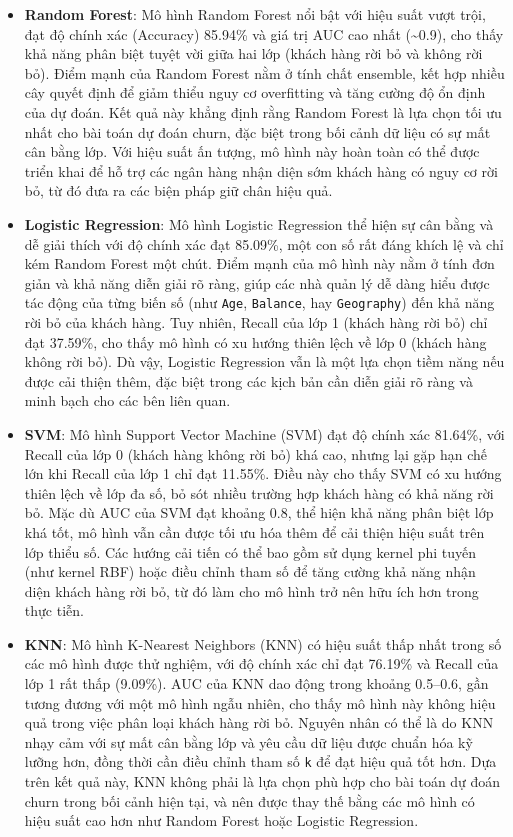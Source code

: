 \documentclass[
]{article}
\begin{document}
\begin{itemize}
\item
  \textbf{Random Forest}: Mô hình Random Forest nổi bật với hiệu suất
  vượt trội, đạt độ chính xác (Accuracy) 85.94\% và giá trị AUC cao nhất
  (\textasciitilde0.9), cho thấy khả năng phân biệt tuyệt vời giữa hai
  lớp (khách hàng rời bỏ và không rời bỏ). Điểm mạnh của Random Forest
  nằm ở tính chất ensemble, kết hợp nhiều cây quyết định để giảm thiểu
  nguy cơ overfitting và tăng cường độ ổn định của dự đoán. Kết quả này
  khẳng định rằng Random Forest là lựa chọn tối ưu nhất cho bài toán dự
  đoán churn, đặc biệt trong bối cảnh dữ liệu có sự mất cân bằng lớp.
  Với hiệu suất ấn tượng, mô hình này hoàn toàn có thể được triển khai
  để hỗ trợ các ngân hàng nhận diện sớm khách hàng có nguy cơ rời bỏ, từ
  đó đưa ra các biện pháp giữ chân hiệu quả.
\item
  \textbf{Logistic Regression}: Mô hình Logistic Regression thể hiện sự
  cân bằng và dễ giải thích với độ chính xác đạt 85.09\%, một con số rất
  đáng khích lệ và chỉ kém Random Forest một chút. Điểm mạnh của mô hình
  này nằm ở tính đơn giản và khả năng diễn giải rõ ràng, giúp các nhà
  quản lý dễ dàng hiểu được tác động của từng biến số (như \texttt{Age},
  \texttt{Balance}, hay \texttt{Geography}) đến khả năng rời bỏ của
  khách hàng. Tuy nhiên, Recall của lớp 1 (khách hàng rời bỏ) chỉ đạt
  37.59\%, cho thấy mô hình có xu hướng thiên lệch về lớp 0 (khách hàng
  không rời bỏ). Dù vậy, Logistic Regression vẫn là một lựa chọn tiềm
  năng nếu được cải thiện thêm, đặc biệt trong các kịch bản cần diễn
  giải rõ ràng và minh bạch cho các bên liên quan.
\item
  \textbf{SVM}: Mô hình Support Vector Machine (SVM) đạt độ chính xác
  81.64\%, với Recall của lớp 0 (khách hàng không rời bỏ) khá cao, nhưng
  lại gặp hạn chế lớn khi Recall của lớp 1 chỉ đạt 11.55\%. Điều này cho
  thấy SVM có xu hướng thiên lệch về lớp đa số, bỏ sót nhiều trường hợp
  khách hàng có khả năng rời bỏ. Mặc dù AUC của SVM đạt khoảng 0.8, thể
  hiện khả năng phân biệt lớp khá tốt, mô hình vẫn cần được tối ưu hóa
  thêm để cải thiện hiệu suất trên lớp thiểu số. Các hướng cải tiến có
  thể bao gồm sử dụng kernel phi tuyến (như kernel RBF) hoặc điều chỉnh
  tham số để tăng cường khả năng nhận diện khách hàng rời bỏ, từ đó làm
  cho mô hình trở nên hữu ích hơn trong thực tiễn.
\item
  \textbf{KNN}: Mô hình K-Nearest Neighbors (KNN) có hiệu suất thấp nhất
  trong số các mô hình được thử nghiệm, với độ chính xác chỉ đạt 76.19\%
  và Recall của lớp 1 rất thấp (9.09\%). AUC của KNN dao động trong
  khoảng 0.5--0.6, gần tương đương với một mô hình ngẫu nhiên, cho thấy
  mô hình này không hiệu quả trong việc phân loại khách hàng rời bỏ.
  Nguyên nhân có thể là do KNN nhạy cảm với sự mất cân bằng lớp và yêu
  cầu dữ liệu được chuẩn hóa kỹ lưỡng hơn, đồng thời cần điều chỉnh tham
  số \texttt{k} để đạt hiệu quả tốt hơn. Dựa trên kết quả này, KNN không
  phải là lựa chọn phù hợp cho bài toán dự đoán churn trong bối cảnh
  hiện tại, và nên được thay thế bằng các mô hình có hiệu suất cao hơn
  như Random Forest hoặc Logistic Regression.
\end{itemize}
\end{document}
